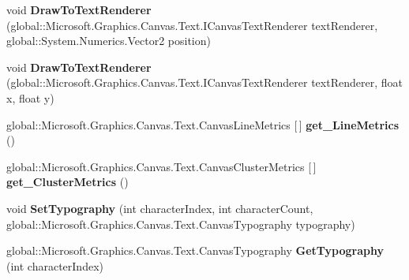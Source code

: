 \begin{DoxyCompactItemize}
\item 
\mbox{\label{interface_microsoft_1_1_graphics_1_1_canvas_1_1_text_1_1_i_canvas_text_layout_ae1ee823236a004edbcb90267c853b058}} 
void {\bfseries Draw\+To\+Text\+Renderer} (global\+::\+Microsoft.\+Graphics.\+Canvas.\+Text.\+I\+Canvas\+Text\+Renderer text\+Renderer, global\+::\+System.\+Numerics.\+Vector2 position)
\item 
\mbox{\label{interface_microsoft_1_1_graphics_1_1_canvas_1_1_text_1_1_i_canvas_text_layout_a97cc5738dc8df87ea520f6446b3f5053}} 
void {\bfseries Draw\+To\+Text\+Renderer} (global\+::\+Microsoft.\+Graphics.\+Canvas.\+Text.\+I\+Canvas\+Text\+Renderer text\+Renderer, float x, float y)
\item 
\mbox{\label{interface_microsoft_1_1_graphics_1_1_canvas_1_1_text_1_1_i_canvas_text_layout_aed7ad1845a233070df02e428dca2f7c2}} 
global\+::\+Microsoft.\+Graphics.\+Canvas.\+Text.\+Canvas\+Line\+Metrics \mbox{[}$\,$\mbox{]} {\bfseries get\+\_\+\+Line\+Metrics} ()
\item 
\mbox{\label{interface_microsoft_1_1_graphics_1_1_canvas_1_1_text_1_1_i_canvas_text_layout_a5be8b44c03e366473263dacc72514c1f}} 
global\+::\+Microsoft.\+Graphics.\+Canvas.\+Text.\+Canvas\+Cluster\+Metrics \mbox{[}$\,$\mbox{]} {\bfseries get\+\_\+\+Cluster\+Metrics} ()
\item 
\mbox{\label{interface_microsoft_1_1_graphics_1_1_canvas_1_1_text_1_1_i_canvas_text_layout_a882229f7daee747656cede530df97f13}} 
void {\bfseries Set\+Typography} (int character\+Index, int character\+Count, global\+::\+Microsoft.\+Graphics.\+Canvas.\+Text.\+Canvas\+Typography typography)
\item 
\mbox{\label{interface_microsoft_1_1_graphics_1_1_canvas_1_1_text_1_1_i_canvas_text_layout_a75787883a628465c1be818d21a9828f6}} 
global\+::\+Microsoft.\+Graphics.\+Canvas.\+Text.\+Canvas\+Typography {\bfseries Get\+Typography} (int character\+Index)

\end{DoxyCompactItemize}
